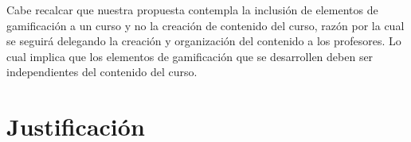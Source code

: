  \noindent Cabe recalcar que nuestra propuesta contempla la inclusión de elementos de gamificación
 a un curso y no la creación de contenido del curso, razón por la cual se seguirá delegando la
 creación y organización del contenido a los profesores. Lo cual implica que los elementos de
 gamificación que se desarrollen deben ser independientes del contenido del curso.


\section{Justificación} \label{sec:justificacion} %






